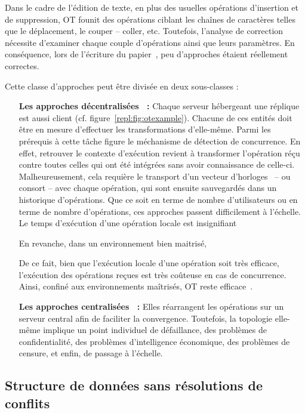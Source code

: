 Dans le cadre de l'édition de texte, en plus des usuelles opérations d'insertion
et de suppression, OT founit des opérations ciblant les chaînes de caractères
telles que le déplacement, le couper -- coller, etc. Toutefois, l'analyse de
correction nécessite d'examiner chaque couple d'opérations ainsi que leurs
paramètres. En conséquence, lors de l'écriture du
papier~\cite{imine2003proving}, peu d'approches étaient réellement correctes. 

Cette classe d'approches peut être divisée en deux sous-classes : 
\begin{itemize}
\item [\textbf{Les approches décentralisées~\cite{sun2009contextbased} :}]
  Chaque serveur hébergeant une réplique est aussi client
  (cf. figure~\ref{repl:fig:otexample}). Chacune de ces entités doit être en
  mesure d'effectuer les transformations d'elle-même. Parmi les prérequis à
  cette tâche figure le méchanisme de détection de concurrence. En effet,
  retrouver le contexte d'exécution revient à transformer l'opération réçu
  contre toutes celles qui ont été intégrées sans avoir connaissance de
  celle-ci. Malheureusement, cela requière le transport d'un vecteur
  d'horloges~\cite{lamport1978time} -- ou consort -- avec chaque opération, qui
  sont ensuite sauvegardés dans un historique d'opérations. Que ce soit en terme
  de nombre d'utilisateurs ou en terme de nombre d'opérations, ces approches
  passent difficilement à l'échelle. Le temps d'exécution d'une opération locale
  est insignifiant

  En revanche, dans un environnement bien maitrisé,

  De ce fait, bien que l'exécution locale d'une opération soit très efficace,
  l'exécution des opérations reçues est très coûteuse en cas de
  concurrence. Ainsi, confiné aux environnements maîtrisés, OT reste
  efficace~\cite{mehdi2014merging}.
\item [\textbf{Les approches centralisées~\cite{nichols1995high} :}] Elles
  réarrangent les opérations sur un serveur central afin de faciliter la
  convergence. Toutefois, la topologie elle-même implique un point individuel de
  défaillance, des problèmes de confidentialité, des problèmes d'intelligence
  économique, des problèmes de censure, et enfin, de passage à l'échelle.
\end{itemize}

\subsection{Structure de données sans résolutions de conflits}
\label{repl:subsec:crdts}

